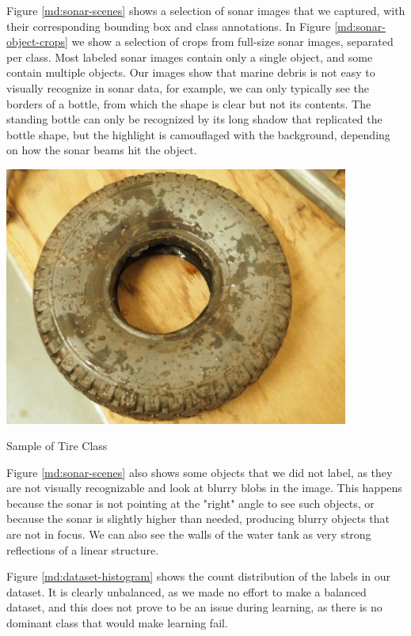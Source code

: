 Figure \ref{md:sonar-scenes} shows a selection of sonar images that we captured, with their corresponding bounding box and class annotations. In Figure \ref{md:sonar-object-crops} we show a selection of crops from full-size sonar images, separated per class.  Most labeled sonar images contain only a single object, and some contain multiple objects. Our images show that marine debris is not easy to visually recognize in sonar data, for example, we can only typically see the borders of a bottle, from which the shape is clear but not its contents. The standing bottle can only be recognized by its long shadow that replicated the bottle shape, but the highlight is camouflaged with the background, depending on how the sonar beams hit the object. 

\begin{marginfigure}
    \centering
    \includegraphics[width = 0.85\textwidth]{chapters/images/dataset/tire.jpg}
    \caption{Sample of Tire Class}
    \label{md:tire}
\end{marginfigure}

Figure \ref{md:sonar-scenes} also shows some objects that we did not label, as they are not visually recognizable and look at blurry blobs in the image. This happens because the sonar is not pointing at the "right" angle to see such objects, or because the sonar is slightly higher than needed, producing blurry objects that are not in focus. We can also see the walls of the water tank as very strong reflections of a linear structure.

Figure \ref{md:dataset-histogram} shows the count distribution of the labels in our dataset. It is clearly unbalanced, as we made no effort to make a balanced dataset, and this does not prove to be an issue during learning, as there is no dominant class that would make learning fail.

